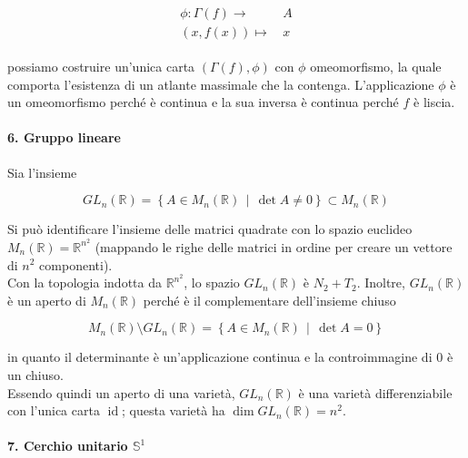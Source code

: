\begin{align}
	\begin{split}
		\phi : \Gamma(f) \to& \, A\\
		(x,f(x)) \mapsto& \, x
	\end{split}
\end{align}

possiamo costruire un'unica carta $ (\Gamma(f),\phi) $ con $ \phi $ omeomorfismo, la quale comporta l'esistenza di un atlante massimale che la contenga. L'applicazione $ \phi $ è un omeomorfismo perché è continua e la sua inversa è continua perché $ f $ è liscia.

\paragraph{6. Gruppo lineare}

Sia l'insieme

\begin{equation}
	GL_{n}(\mathbb{R}) = \left\{ A \in M_{n}(\mathbb{R}) \, \middle| \, \det A \neq 0 \right\} \subset M_{n}(\mathbb{R})
\end{equation}

Si può identificare l'insieme delle matrici quadrate con lo spazio euclideo $ M_{n}(\mathbb{R}) = \mathbb{R}^{n^{2}} $ (mappando le righe delle matrici in ordine per creare un vettore di $ n^{2} $ componenti).\\
Con la topologia indotta da $ \mathbb{R}^{n^{2}} $, lo spazio $ GL_{n}(\mathbb{R}) $ è $ N_{2}+T_{2} $. Inoltre, $ GL_{n}(\mathbb{R}) $ è un aperto di $ M_{n}(\mathbb{R}) $ perché è il complementare dell'insieme chiuso

\begin{equation}
	 M_{n}(\mathbb{R}) \setminus GL_{n}(\mathbb{R}) = \left\{ A \in M_{n}(\mathbb{R}) \, \middle| \, \det A = 0 \right\}
\end{equation}

in quanto il determinante è un'applicazione continua e la controimmagine di $ 0 $ è un chiuso.\\
Essendo quindi un aperto di una varietà, $ GL_{n}(\mathbb{R}) $ è una varietà differenziabile con l'unica carta $ \operatorname{id} $; questa varietà ha $ \dim GL_{n}(\mathbb{R}) = n^{2} $.

\paragraph{7. Cerchio unitario $ \mathbb{S}^{1} $}\label{ex-s1}

